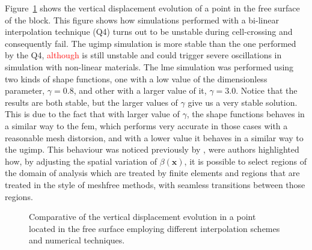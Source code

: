 \documentclass[preprint,12pt,a4paper]{elsarticle}
\newcommand{\vect}[1]{
  \ensuremath{\mathbf{{#1}}}
}
\newcommand{\PNA}[1]{
  \textcolor{red}{{#1}}
}
\begin{document}
Figure~\ref{fig:vertical-displacement-block} shows the vertical
displacement evolution of a point in the free surface of the
block. This figure shows how simulations performed with a bi-linear
interpolation technique (Q4) turns out to be unstable during
cell-crossing and consequently fail. The \acrshort{ugimp} simulation
is more stable than the one performed by the Q4, \PNA{although}  is still
unstable and could trigger severe oscillations in simulation with
non-linear  materials. The \acrshort{lme} simulation was performed
using two kinds of shape functions, one with a low value of the
dimensionless parameter, $\gamma = 0.8$, and other with a larger value
of it, $\gamma = 3.0$. Notice that the results are both stable, but
the larger values of $\gamma$ give us a very stable solution. This is
due to the fact that with larger value of $\gamma$, the shape
functions behaves in a similar way to the \acrshort{fem}, which performs very
accurate in those cases with a reasonable mesh distorsion, and with a
lower value it behaves in a similar way to the \acrshort{ugimp}. This behaviour
was noticed previously by \cite{Arroyo2006}, were authors highlighted
how, by adjusting the spatial variation of $\beta(\vect{x})$, it is
possible to select regions of the domain of analysis which are treated
by finite elements and regions that are treated in the style of
meshfree methods, with seamless transitions between those regions. 
\begin{figure}\sidecaption
  \centering
  \caption{Comparative of the vertical displacement evolution in a
    point located in the free surface employing different
    interpolation schemes and numerical techniques.} 
  \label{fig:vertical-displacement-block}
\end{figure}
\end{document}
